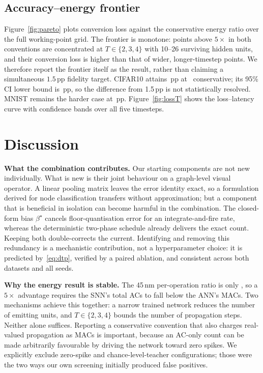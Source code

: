 \subsection{Accuracy--energy frontier}
\label{ssec:frontier}

Figure~\ref{fig:pareto} plots conversion loss against the conservative energy ratio over the full working-point grid. The frontier is monotone: points above $5\times$ in both conventions are concentrated at $T\in\{2,3,4\}$ with 10--26 surviving hidden units, and their conversion loss is higher than that of wider, longer-timestep points. We therefore report the frontier itself as the result, rather than claiming a simultaneous $1.5$\,pp fidelity target. CIFAR10 attains \CIFARLoss\,pp at \CIFAREc\texttimes\ conservative; its 95\% CI lower bound is \CIFARLower\,pp, so the difference from 1.5\,pp is not statistically resolved. MNIST remains the harder case at \MNISTLoss\,pp. Figure~\ref{fig:lossT} shows the loss--latency curve with confidence bands over all five timesteps.

\section{Discussion}
\label{sec:discussion}

\textbf{What the combination contributes.} Our starting components are not new individually. What is new is their joint behaviour on a graph-level visual operator. A linear pooling matrix leaves the error identity exact, so a formulation derived for node classification transfers without approximation; but a component that is beneficial in isolation can become harmful in the combination. The closed-form bias $\beta^\star$ cancels floor-quantisation error for an integrate-and-fire rate, whereas the deterministic two-phase schedule already delivers the exact count. Keeping both double-corrects the current. Identifying and removing this redundancy is a mechanistic contribution, not a hyperparameter choice: it is predicted by~\eqref{eq:dtp}, verified by a paired ablation, and consistent across both datasets and all seeds.

\textbf{Why the energy result is stable.} The 45\,nm per-operation ratio is only \MACACRatio, so a $5\times$ advantage requires the SNN's total ACs to fall below the ANN's MACs. Two mechanisms achieve this together: a narrow trained network reduces the number of emitting units, and $T\in\{2,3,4\}$ bounds the number of propagation steps. Neither alone suffices. Reporting a conservative convention that also charges real-valued propagation as MACs is important, because an AC-only count can be made arbitrarily favourable by driving the network toward zero spikes. We explicitly exclude zero-spike and chance-level-teacher configurations; those were the two ways our own screening initially produced false positives.

